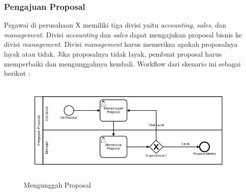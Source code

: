 \subsubsection{Pengajuan Proposal}
Pegawai di perusahaan X memiliki tiga divisi yaitu \textit{accounting}, \textit{sales}, dan \textit{management}. Divisi \textit{accounting} dan \textit{sales} dapat mengajukan proposal bisnis ke divisi \textit{management}. Divisi \textit{management} harus memeriksa apakah proposalnya layak atau tidak. Jika proposalnya tidak layak, pembuat proposal harus memperbaiki dan mengunggahnya kembali. Workflow dari skenario ini sebagai berikut :

		\begin{figure}[H]
			\centering
			\includegraphics[scale=0.5]{Gambar/Bab-3/Kasus2-3}
			\caption{Mengunggah Proposal} 
			\label{fig:mengunggahproposalgroup}
		\end{figure}

